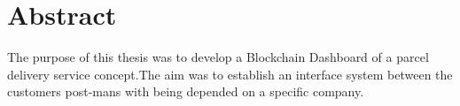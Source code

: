\chapter*{Abstract}
\label{cha:abstract}

The purpose of this thesis was to develop a Blockchain Dashboard of a parcel delivery service concept.The aim was to establish an interface system between the customers post-mans with being depended on a specific company.
